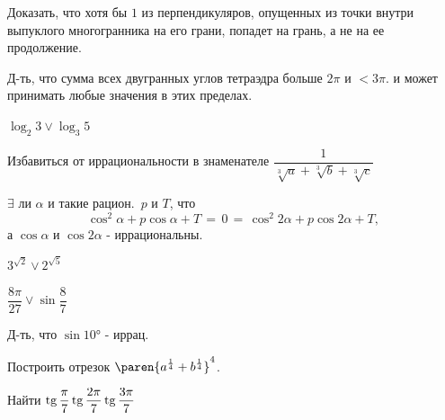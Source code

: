 \documentclass{article}
\begin{document}
\problem  %
Доказать, что хотя бы $1$ из перпендикуляров, опущенных из точки внутри выпуклого многогранника на его грани, попадет на грань, а не на ее продолжение.


\setcounter{problemcounter}{53}


\problem  %
Д-ть, что сумма всех двугранных углов тетраэдра больше $2 \pi$ и $< 3 \pi$.
и может принимать любые значения в этих пределах.


\problem  %
$\log_{2}{3} \mathrel{\vee} \log_{3}{5}$


\problem  %
Избавиться от иррациональности в знаменателе $\dfrac{1}{\sqrt[3]{a} + \sqrt[3]{b} + \sqrt[3]{c}}$


\setcounter{problemcounter}{57}


\problem  %
$\exists$ ли $\alpha$ и такие рацион.\ $p$ и $T$, что
\begin{equation*}
  \cos^2 \alpha + p \cos\alpha + T \,
  = \, 0 \,
  = \, \cos^2 2 \alpha + p \cos 2 \alpha + T ,
\end{equation*}
а $\cos\alpha$ и $\cos 2\alpha$ - иррациональны.


\setcounter{problemcounter}{61}


\problem  %
$3^{\sqrt{2}} \mathrel{\vee} 2^{\sqrt{5}}$


\problem  %
$\dfrac{8 \pi}{27} \mathrel{\vee} \sin\dfrac{8}{7}$


\setcounter{problemcounter}{65}


\problem  %
Д-ть, что $\sin\ang{10}$ - иррац.


\problem  %
Построить отрезок $\paren{a^{\frac{1}{4}} + b^{\frac{1}{4}}}^{4}$.


\problem  %
Найти $\operatorname{tg}\dfrac{\pi}{7} \operatorname{tg}\dfrac{2 \pi}{7} \operatorname{tg}\dfrac{3 \pi}{7}$
\end{document}
